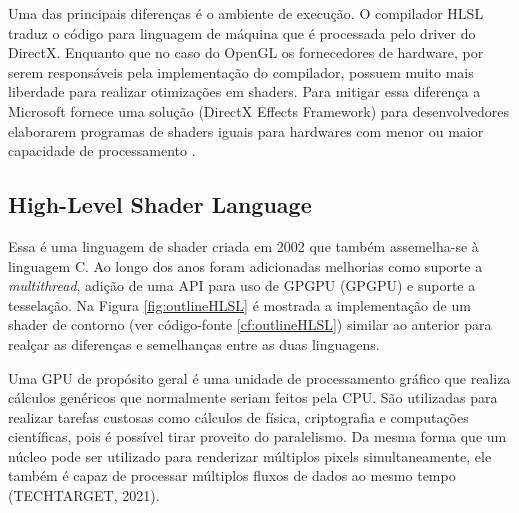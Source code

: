 Uma das principais diferenças é o ambiente de execução. O compilador HLSL traduz o código para linguagem de máquina que é processada pelo driver do DirectX. Enquanto que no caso do OpenGL os fornecedores de hardware, por serem responsáveis pela implementação do compilador, possuem muito mais liberdade para realizar otimizações em shaders. Para mitigar essa diferença a Microsoft fornece uma solução (DirectX Effects Framework) para desenvolvedores elaborarem programas de shaders iguais para hardwares com menor ou maior capacidade de processamento \cite{GLSLBook}.

\subsection{High-Level Shader Language}
\label{sec:hlsl}

Essa é uma linguagem de shader criada em 2002 que também assemelha-se à linguagem C. Ao longo dos anos foram adicionadas melhorias como suporte a \textit{\Gls{multithread}}, adição de uma API para uso de GPGPU (\acrlong{GPGPU}) e suporte a tesselação. Na Figura \ref{fig:outlineHLSL} é mostrada a implementação de um shader de contorno (ver código-fonte \ref{cf:outlineHLSL}) similar ao anterior para realçar as diferenças e semelhanças entre as duas linguagens.

\begin{figure}[h!]
	\centering
\end{figure}

Uma GPU de propósito geral é uma unidade de processamento gráfico que realiza cálculos genéricos que normalmente seriam feitos pela CPU. São utilizadas para realizar tarefas custosas como cálculos de física, criptografia e computações científicas, pois é possível tirar proveito do paralelismo. Da mesma forma que um núcleo pode ser utilizado para renderizar múltiplos pixels simultaneamente, ele também é capaz de processar múltiplos fluxos de dados ao mesmo tempo (TECHTARGET, 2021)\nocite{GPGPU}.

